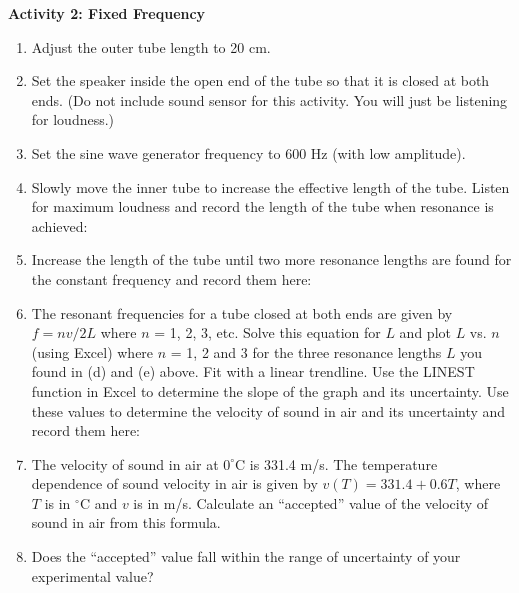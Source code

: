 \textbf{Activity 2: Fixed Frequency} 
\begin{enumerate}[labparts]

\item Adjust the outer tube length to 20 cm.

\item Set the speaker inside the open end of the tube so that it is closed at both ends. (Do not include sound sensor for this activity. You will just be listening for loudness.)

\item Set the sine wave generator frequency to 600 Hz (with low amplitude).

\item Slowly move the inner tube to increase the effective length of the tube. Listen for maximum loudness and record the length of the tube when resonance is achieved:
\vspace{10mm}

\item Increase the length of the tube until two more resonance lengths are found for the constant frequency and record them here:
\vspace{10mm}


\item The resonant frequencies for a tube closed at both ends are given by 
$f=nv/2L$ where $n$ = 1, 2, 3, etc. Solve this equation for $L$ and plot $L$ 
vs. $n$ (using Excel) where $n$ = 1, 2 and 3 for the three resonance lengths $L$
you found in (d) and (e) above. Fit with a linear trendline. Use the LINEST function in Excel to determine the slope of the graph and its uncertainty. Use these values to determine the velocity of sound in air and its uncertainty and record them here:
\vspace{20mm}

\item The velocity of sound in air at $0^\circ$C is 331.4 m/s.  The temperature dependence of sound velocity in air is given by $v(T) = 331.4 + 0.6T$, where $T$ is in $^\circ$C and $v$ is in m/s. Calculate an ``accepted'' value of the velocity of sound in air from this formula.
\vspace{20mm}

\item Does the ``accepted'' value fall within the range of uncertainty of your experimental value?

\end{enumerate}
